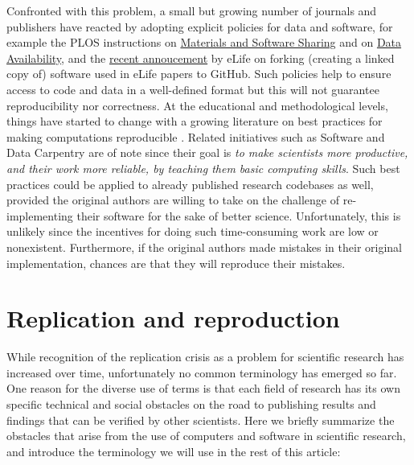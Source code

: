 \documentclass[a4paper,10pt, twocolumn]{article}
\begin{document}
Confronted with this problem, a small but growing number of journals and
publishers have reacted by adopting explicit policies for data and software, for example the PLOS instructions on
\href{http://journals.plos.org/plosone/s/materials-and-software-sharing}{Materials
  and Software Sharing} and
on \href{http://journals.plos.org/plosone/s/data-availability}{Data Availability},
and the
\href{https://elifesciences.org/elife-news/inside-elife-forking-software-used-elife-papers-github}{recent
  annoucement} by eLife on forking (creating a linked copy of) software used in eLife papers to GitHub.
Such policies help to ensure access to code and data in a well-defined format
\citep{perkel:2016} but this will not guarantee reproducibility nor
correctness.
At the educational and methodological levels, things have started to change with a
growing literature on best practices for making computations reproducible
\citep{sandve:2013, crook:2013, wilson:2014, halchenko:2015, janz:2015,
  hinsen:2015}.
  Related initiatives such as Software and Data Carpentry
\citep{wilson:2016} are of note since their goal is {\em to make
scientists more productive, and their work more reliable, by teaching them basic computing skills}.
Such best practices could be applied to already published research codebases as well, provided the original authors are willing to take on the challenge of 
re-implementing their software for the sake of better science.
Unfortunately, this is unlikely since the
incentives for doing such time-consuming work are low or nonexistent.
Furthermore, if the original authors made mistakes in their original
implementation, chances are that they will reproduce their mistakes.\\


\section*{Replication and reproduction}
\label{sec:replication-reproduction}
While recognition of the replication crisis as a problem
for scientific research has increased over time, unfortunately no 
common terminology has emerged so far. One reason for
the diverse use of terms is that each field of research has its own
specific technical and social obstacles on the road to publishing
results and findings that can be verified by other scientists. Here we
briefly summarize the obstacles that arise from the use of computers
and software in scientific research, and introduce the terminology we
will use in the rest of this article:\\
\end{document}
